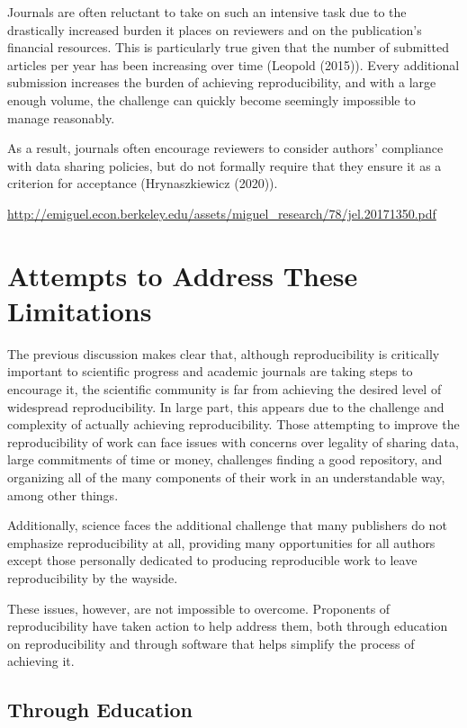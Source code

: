 \documentclass[12pt,twoside]{reedthesis}
\begin{document}
Journals are often reluctant to take on such an intensive task due to
the drastically increased burden it places on reviewers and on the
publication's financial resources. This is particularly true given that
the number of submitted articles per year has been increasing over time
(Leopold (2015)). Every additional submission increases the burden of
achieving reproducibility, and with a large enough volume, the challenge
can quickly become seemingly impossible to manage reasonably.

As a result, journals often encourage reviewers to consider authors'
compliance with data sharing policies, but do not formally require that
they ensure it as a criterion for acceptance (Hrynaszkiewicz (2020)).

\url{http://emiguel.econ.berkeley.edu/assets/miguel_research/78/jel.20171350.pdf}

\section{Attempts to Address These
Limitations}\label{attempts-to-address-these-limitations}

The previous discussion makes clear that, although reproducibility is
critically important to scientific progress and academic journals are
taking steps to encourage it, the scientific community is far from
achieving the desired level of widespread reproducibility. In large
part, this appears due to the challenge and complexity of actually
achieving reproducibility. Those attempting to improve the
reproducibility of work can face issues with concerns over legality of
sharing data, large commitments of time or money, challenges finding a
good repository, and organizing all of the many components of their work
in an understandable way, among other things.

Additionally, science faces the additional challenge that many
publishers do not emphasize reproducibility at all, providing many
opportunities for all authors except those personally dedicated to
producing reproducible work to leave reproducibility by the wayside.

These issues, however, are not impossible to overcome. Proponents of
reproducibility have taken action to help address them, both through
education on reproducibility and through software that helps simplify
the process of achieving it.

\subsection{Through Education}\label{through-education}
\end{document}
